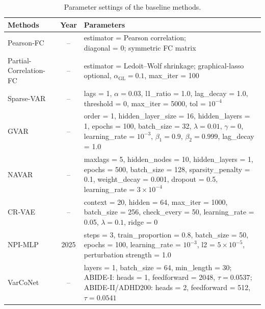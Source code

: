 \begin{table}[t]
    \centering
    \caption{Parameter settings of the baseline methods.}
    \label{tab:baseline-parameter-settings}
    \small
    \setlength{\tabcolsep}{4pt}
    \renewcommand{\arraystretch}{1.15}
    \begin{tabularx}{\textwidth}{@{}>{\raggedright\arraybackslash}p{}c>{\raggedright\arraybackslash}X@{}}
        \toprule
        \textbf{Methods} & \textbf{Year} & \textbf{Parameters} \\
        \midrule
        Pearson-FC & -- & \makecell[l]{estimator = Pearson correlation;\\ diagonal = 0; symmetric FC matrix} \\
        Partial-Correlation-FC & -- & \makecell[l]{estimator = Ledoit--Wolf shrinkage;\\ graphical-lasso optional, $\alpha_{\mathrm{GL}} = 0.1$, max\_iter = 100} \\
        Sparse-VAR & -- & \makecell[l]{lags = 1, $\alpha = 0.03$, l1\_ratio = 1.0, lag\_decay = 1.0,\\ threshold = 0, max\_iter = 5000, tol = $10^{-4}$} \\
        GVAR & -- & \makecell[l]{order = 1, hidden\_layer\_size = 16, hidden\_layers = 1,\\ epochs = 100, batch\_size = 32, $\lambda = 0.01$, $\gamma = 0$,\\ learning\_rate = $10^{-3}$, $\beta_1 = 0.9$, $\beta_2 = 0.999$, lag\_decay = 1.0} \\
        NAVAR & -- & \makecell[l]{maxlags = 5, hidden\_nodes = 10, hidden\_layers = 1,\\ epochs = 500, batch\_size = 128, sparsity\_penalty = 0.1,\\ weight\_decay = 0.001, dropout = 0.5, learning\_rate = $3\times10^{-4}$} \\
        CR-VAE & -- & \makecell[l]{context = 20, hidden = 64, max\_iter = 1000, batch\_size = 256,\\ check\_every = 50, learning\_rate = 0.05, $\lambda = 0.1$, ridge = 0} \\
        NPI-MLP & 2025 & \makecell[l]{steps = 3, train\_proportion = 0.8, batch\_size = 50, epochs = 100,\\ learning\_rate = $10^{-3}$, l2 = $5\times10^{-5}$, perturbation strength = 1.0} \\
        VarCoNet & -- & \makecell[l]{layers = 1, batch\_size = 64, min\_length = 30;\\ ABIDE-I: heads = 1, feedforward = 2048, $\tau = 0.0537$;\\ ABIDE-II/ADHD200: heads = 2, feedforward = 512, $\tau = 0.0541$} \\

\end{tabularx}
\end{table}
